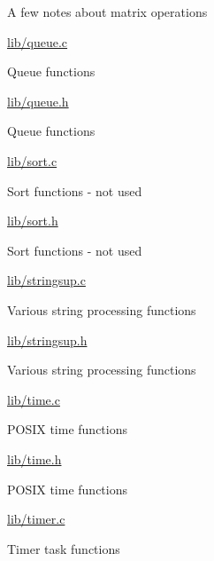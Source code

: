 \begin{DoxyItemize}
\begin{DoxyItemize}
\begin{DoxyItemize}
\item A few notes about matrix operations
\end{DoxyItemize}
\item \hyperlink{queue_8c}{lib/queue.\+c}
\begin{DoxyItemize}
\item Queue functions
\end{DoxyItemize}
\item \hyperlink{queue_8h}{lib/queue.\+h}
\begin{DoxyItemize}
\item Queue functions
\end{DoxyItemize}
\item \hyperlink{sort_8c}{lib/sort.\+c}
\begin{DoxyItemize}
\item Sort functions -\/ not used
\end{DoxyItemize}
\item \hyperlink{sort_8h}{lib/sort.\+h}
\begin{DoxyItemize}
\item Sort functions -\/ not used
\end{DoxyItemize}
\item \hyperlink{stringsup_8c}{lib/stringsup.\+c}
\begin{DoxyItemize}
\item Various string processing functions
\end{DoxyItemize}
\item \hyperlink{stringsup_8h}{lib/stringsup.\+h}
\begin{DoxyItemize}
\item Various string processing functions
\end{DoxyItemize}
\item \hyperlink{time_8c}{lib/time.\+c}
\begin{DoxyItemize}
\item P\+O\+S\+IX time functions
\end{DoxyItemize}
\item \hyperlink{time_8h}{lib/time.\+h}
\begin{DoxyItemize}
\item P\+O\+S\+IX time functions
\end{DoxyItemize}
\item \hyperlink{timer_8c}{lib/timer.\+c}
\begin{DoxyItemize}
\item Timer task functions
\end{DoxyItemize}

\end{DoxyItemize}
\end{DoxyItemize}
